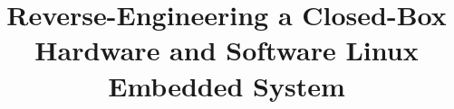 \documentclass[conference]{IEEEtran}
\begin{document}
%
\title{Reverse-Engineering a Closed-Box Hardware and Software Linux Embedded System}


% 






% 
\end{document}
